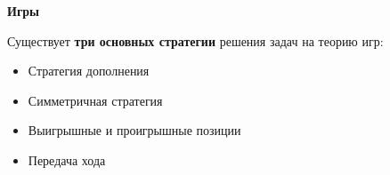 \documentclass{article}
\begin{document}
    \large

    \begin{center}
        \textbf{Игры}
    \end{center}

    Существует \textbf{три основных стратегии} решения задач на теорию игр:
    \begin{itemize}
        \item Стратегия дополнения

        \item Симметричная стратегия

        \item Выигрышные и проигрышные позиции

        \item Передача хода
    \end{itemize}
\end{document}
